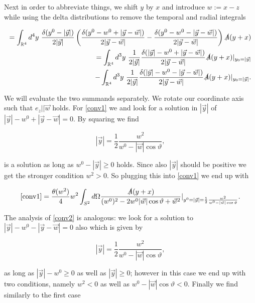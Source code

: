 \documentclass[a4paper,11pt]{article}
\begin{document}
Next in order to abbreviate things, we shift \(y\) by \(x\) and introduce \(w:= x-z\) while using the delta distributions to remove the
temporal and radial integrals

\begin{align}
=\int_{\mathbb{R}^4} d^4 y~
 \frac{\delta(y^0 - |\vec{y}|)}{2|\vec{y}|}
\left( \frac{\delta(y^0-w^0 + |\vec{y}-\vec{w}|)}{2|\vec{y}-\vec{w}|} - \frac{\delta(y^0-w^0 - |\vec{y}-\vec{w}|)}{2|\vec{y}-\vec{w}|} \right)
\slashed{A}(y+x) \\
=\int_{\mathbb{R}^4} d^3 y~\label{conv1}
 \frac{1}{2|\vec{y}|}
 \frac{\delta(|\vec{y}| -w^0 + |\vec{y}-\vec{w}|)}{2|\vec{y}-\vec{w}|}\slashed{A}(y+x)|_{y_0=|\vec{y}|}\\
-\int_{\mathbb{R}^4} d^3 y~\label{conv2}
 \frac{1}{2|\vec{y}|}
\frac{\delta(|\vec{y}|-w^0 - |\vec{y}-\vec{w}|)}{2|\vec{y}-\vec{w}|}
\slashed{A}(y+x)|_{y_0=|\vec{y}|}.
\end{align}

We will evaluate the two summands separately. We rotate our coordinate axis such that \(e_z || \vec{w}\) holds. For \eqref{conv1} we
 and look for a solution in \(|\vec{y}|\) of \(|\vec{y}| - w^0 + |\vec{y}-\vec{w}|=0\). By squaring we find

\begin{equation}
|\vec{y}|= \frac{1}{2} \frac{w^2}{w^0 - |\vec{w}| \cos\vartheta},
\end{equation}

is a solution as long as \(w^0-|\vec{y}| \ge 0\) holds. Since also \(|\vec{y}|\) should be positive we get the stronger condition \(w^2>0\).
So plugging this into \eqref{conv1} we end up with

\begin{align}
\eqref{conv1}= \frac{\theta(w^2)}{4} w^2 \int_{S^2} d \Omega \frac{\slashed{A}(y+x)}{(w^0)^2 - 2 w^0 |\vec{w}| \cos\vartheta + \vec{w}^2}|_{y^0=|\vec{y}|=\frac{1}{2}\frac{w^2}{w^0-|\vec{w}|\cos\vartheta}}.
\end{align}

The analysis of \eqref{conv2} is analogous: we look for a solution to \(|\vec{y}|-w^0-|\vec{y}-\vec{w}|=0\) also which is given by

\begin{equation}
|\vec{y}|= \frac{1}{2} \frac{w^2}{w^0-|\vec{w}|\cos\vartheta},
\end{equation}

as long as \(|\vec{y}|-w^0\ge0\) as well as \(|\vec{y}|\ge0\); however in this case we end up with two conditions, namely \(w^2<0 \) 
as well as \(w^0-|\vec{w}|\cos\vartheta <0\). Finally we find similarly to the first case 
\end{document}
